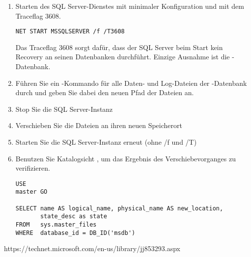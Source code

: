             \begin{enumerate}
                \item Starten des SQL Server-Dienstes mit minimaler
                Konfiguration und mit dem Traceflag 3608.
                \begin{lstlisting}[language=terminal,caption={Starten des SQL
                Server unter Umgehung des automatischen Recoveries},
                label=admin03_24]
NET START MSSQLSERVER /f /T3608
                \end{lstlisting}
                \begin{merke}
                  Das Traceflag 3608 sorgt dafür, dass der SQL Server beim Start
                  kein Recovery an seinen Datenbanken durchführt. Einzige
                  Ausnahme ist die -Datenbank.
                \end{merke}
              \item Führen Sie ein -Kommando für alle Daten- und Log-Dateien der
              -Datenbank durch und geben Sie dabei den neuen
              Pfad der Dateien an.
              \item Stop Sie die SQL Server-Instanz
              \item Verschieben Sie die Dateien an ihren neuen Speicherort
              \item Starten Sie die SQL Server-Instanz erneut (ohne /f und /T)
              \item Benutzen Sie Katalogsicht , um
              das Ergebnis des Verschiebevorganges zu verifizieren.
                \begin{lstlisting}[language=ms_sql,caption={Abfragen
                der View \identifier{sys.master\_files}},label=admin03_23]
USE
master GO

SELECT name AS logical_name, physical_name AS new_location, 
       state_desc as state
FROM   sys.master_files
WHERE  database_id = DB_ID('msdb')
                \end{lstlisting}
          \end{enumerate}
            \begin{literaturinternet}
            \item \cite{ms188396}
          \end{literaturinternet}
  
  
  https://technet.microsoft.com/en-us/library/jj853293.aspx